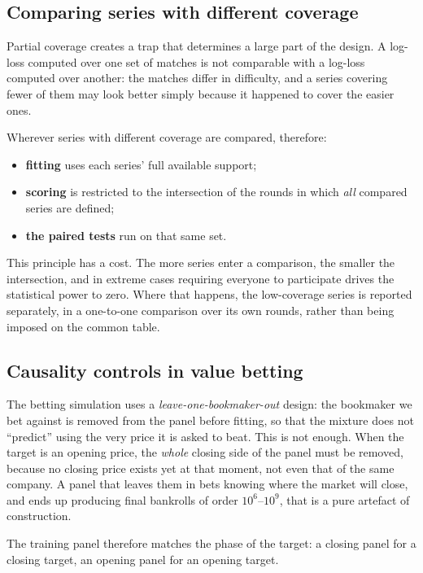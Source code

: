 \documentclass[12pt,a4paper,oneside]{report}
\renewcommand{\_}{\oldunderscore\allowbreak}
\theoremstyle{definition}
\theoremstyle{plain}
\theoremstyle{definition}   %
\begin{document}
\subsection{Comparing series with different coverage}
\label{sec:common-rounds}

Partial coverage creates a trap that determines a large part of the design. A log-loss computed
over one set of matches is not comparable with a log-loss computed over another: the matches
differ in difficulty, and a series covering fewer of them may look better simply because it
happened to cover the easier ones.

Wherever series with different coverage are compared, therefore:

\begin{itemize}
  \item \textbf{fitting} uses each series' full available support;
  \item \textbf{scoring} is restricted to the intersection of the rounds in which \emph{all}
        compared series are defined;
  \item \textbf{the paired tests} run on that same set.
\end{itemize}

This principle has a cost. The more series enter a comparison, the smaller the intersection, and
in extreme cases requiring everyone to participate drives the statistical power to zero. Where
that happens, the low-coverage series is reported separately, in a one-to-one comparison over its
own rounds, rather than being imposed on the common table.

\subsection{Causality controls in value betting}

The betting simulation uses a \emph{leave-one-bookmaker-out} design: the bookmaker we bet against
is removed from the panel before fitting, so that the mixture does not ``predict'' using the very
price it is asked to beat. This is not enough. When the target is an opening price, the
\emph{whole} closing side of the panel must be removed, because no closing price exists yet at
that moment, not even that of the same company. A panel that leaves them in bets knowing where
the market will close, and ends up producing final bankrolls of order $10^6$--$10^9$, that is a
pure artefact of construction.

The training panel therefore matches the phase of the target: a closing panel for a closing
target, an opening panel for an opening target.
\end{document}
